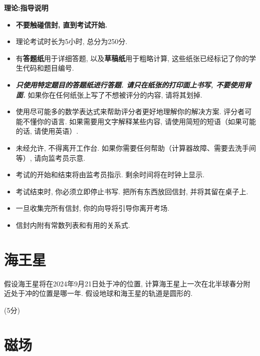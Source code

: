 \documentclass[a4paper,fontset=fandol]{ctexart}
\newcommand{\points}[1]{\par %
	\noindent %
	\hfill (#1分)%
	\vspace{1em}
	}
\begin{document}
	{
	\Large\bfseries\noindent 理论:\hspace{0.5em}指导说明
	}
	
	\begin{itemize}
		\item {\bfseries 不要触碰信封, 直到考试开始. }
		
		\item 理论考试时长为5小时, 总分为250分. 
		
		\item 有\textbf{答题纸}用于详细答题, 以及\textbf{草稿纸}用于粗略计算, 这些纸张已经标记了你的学生代码和题目编号. 
		
		\item {\bfseries\itshape 只使用特定题目的答题纸进行答题. 请只在纸张的打印面上书写, 不要使用背面. }如果你在任何纸张上写了不想被评分的内容, 请将其划掉. 
		
		\item 使用尽可能多的数学表达式来帮助评分者更好地理解你的解决方案. 评分者可能不懂你的语言. 如果需要用文字解释某些内容, 请使用简短的短语（如果可能的话, 请使用英语）. 
		
		\item 未经允许, 不得离开工作台. 如果你需要任何帮助（计算器故障、需要去洗手间等）, 请向监考员示意. 
		
		\item 考试的开始和结束将由监考员指示. 剩余时间将在时钟上显示. 
		
		\item 考试结束时, 你必须立即停止书写. 把所有东西放回信封, 并将其留在桌子上. 
		
		\item 一旦收集完所有信封, 你的向导将引导你离开考场. 
		
		\item 信封内附有常数列表和有用的关系式. 
	\end{itemize}
	
	\newpage
	\section{海王星}
	
	假设海王星将在2024年9月21日处于冲的位置, 计算海王星上一次在北半球春分附近处于冲的位置是哪一年. 假设地球和海王星的轨道是圆形的. 
	
	\points{5}
	
	\section{磁场}
	
\end{document}
